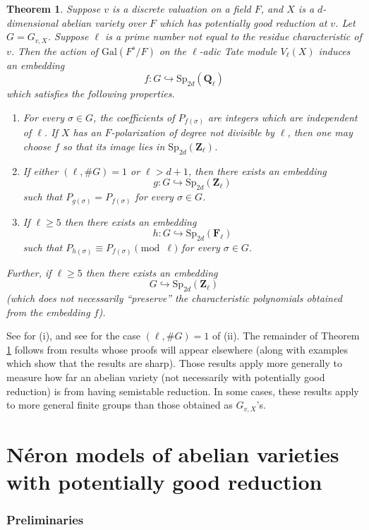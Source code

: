 \documentclass{amsart}
\def\Q{{\mathbf Q}}
\def\Z{{\mathbf Z}}
\def\F{\mathbf{F}}
\def\Gal{\mathrm{Gal}}
\def\Sp{\mathrm{Sp}}
\newtheorem{thm}{Theorem}[section]
\theoremstyle{definition}
\begin{document}
\begin{thm}
\label{Gthm}
Suppose $v$ is a discrete valuation on a field $F$, and
$X$ is a $d$-dimensional abelian variety over 
$F$ which has potentially good reduction at $v$. 
Let $G=G_{v,X}$. Suppose $\ell$ is a prime number not
equal to the residue characteristic of $v$. 
Then the action of $\Gal(F^s/F)$ on the $\ell$-adic Tate module
$V_\ell(X)$ induces an embedding
$$f : G \hookrightarrow \Sp_{2d}(\Q_\ell)$$
which satisfies the following properties.
\begin{enumerate}
\item[(i)] 
For every $\sigma \in G$, the coefficients of $P_{f(\sigma)}$
are integers which are independent of $\ell$.
If $X$ has an $F$-polarization of degree not divisible by $\ell$,
then one may choose $f$ so that its image lies in 
$\Sp_{2d}(\Z_\ell)$.
\item[(ii)] 
If either $(\ell,\#G)=1$ or $\ell > d+1$, then there exists
an embedding 
$$g : G \hookrightarrow \Sp_{2d}(\Z_\ell)$$
such that $P_{g(\sigma)} = P_{f(\sigma)}$ 
for every $\sigma \in G$.
\item[(iii)] 
If $\ell \ge 5$ then there exists an embedding 
$$h : G \hookrightarrow \Sp_{2d}(\F_\ell)$$
such that $P_{h(\sigma)} \equiv P_{f(\sigma)} \pmod{\ell}$ 
for every $\sigma \in G$.
\end{enumerate}
Further, if $\ell \ge 5$ then there exists an embedding 
$$G \hookrightarrow \Sp_{2d}(\Z_\ell)$$
(which does not necessarily ``preserve'' the characteristic
polynomials obtained from the embedding $f$).
\end{thm}

See \cite{Serre-Tate} for (i), and
see \cite{inertia} for the case $(\ell,\#G)=1$ of
(ii). The remainder of Theorem \ref{Gthm} follows from results
whose proofs will appear elsewhere (along with examples which
show that the results are sharp). Those results apply more
generally to measure how far an abelian variety (not necessarily
with potentially good reduction) is from having semistable reduction.
In some cases, these results apply to more general finite groups 
than those obtained as $G_{v,X}$'s.


\part{N\'eron models of abelian varieties with potentially good reduction}
\label{neronpart}

\section{Preliminaries}
\end{document}
